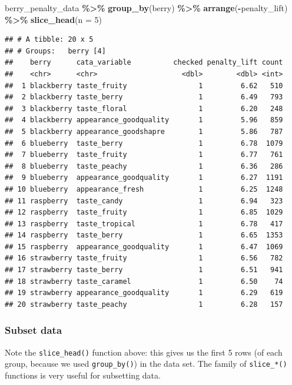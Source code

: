 \documentclass[
]{book}
\newenvironment{Shaded}{\begin{snugshade}}{\end{snugshade}}
\newcommand{\AttributeTok}[1]{\textcolor[rgb]{0.13,0.29,0.53}{#1}}
\newcommand{\DecValTok}[1]{\textcolor[rgb]{0.00,0.00,0.81}{#1}}
\newcommand{\FunctionTok}[1]{\textcolor[rgb]{0.13,0.29,0.53}{\textbf{#1}}}
\newcommand{\NormalTok}[1]{#1}
\newcommand{\SpecialCharTok}[1]{\textcolor[rgb]{0.81,0.36,0.00}{\textbf{#1}}}
\begin{document}
\begin{Shaded}
\begin{Highlighting}[]
\NormalTok{berry\_penalty\_data }\SpecialCharTok{\%\textgreater{}\%}
  \FunctionTok{group\_by}\NormalTok{(berry) }\SpecialCharTok{\%\textgreater{}\%}
  \FunctionTok{arrange}\NormalTok{(}\SpecialCharTok{{-}}\NormalTok{penalty\_lift) }\SpecialCharTok{\%\textgreater{}\%}
  \FunctionTok{slice\_head}\NormalTok{(}\AttributeTok{n =} \DecValTok{5}\NormalTok{)}
\end{Highlighting}
\end{Shaded}

\begin{verbatim}
## # A tibble: 20 x 5
## # Groups:   berry [4]
##    berry      cata_variable          checked penalty_lift count
##    <chr>      <chr>                    <dbl>        <dbl> <int>
##  1 blackberry taste_fruity                 1         6.62   510
##  2 blackberry taste_berry                  1         6.49   793
##  3 blackberry taste_floral                 1         6.20   248
##  4 blackberry appearance_goodquality       1         5.96   859
##  5 blackberry appearance_goodshapre        1         5.86   787
##  6 blueberry  taste_berry                  1         6.78  1079
##  7 blueberry  taste_fruity                 1         6.77   761
##  8 blueberry  taste_peachy                 1         6.36   286
##  9 blueberry  appearance_goodquality       1         6.27  1191
## 10 blueberry  appearance_fresh             1         6.25  1248
## 11 raspberry  taste_candy                  1         6.94   323
## 12 raspberry  taste_fruity                 1         6.85  1029
## 13 raspberry  taste_tropical               1         6.78   417
## 14 raspberry  taste_berry                  1         6.65  1353
## 15 raspberry  appearance_goodquality       1         6.47  1069
## 16 strawberry taste_fruity                 1         6.56   782
## 17 strawberry taste_berry                  1         6.51   941
## 18 strawberry taste_caramel                1         6.50    74
## 19 strawberry appearance_goodquality       1         6.29   619
## 20 strawberry taste_peachy                 1         6.28   157
\end{verbatim}

\hypertarget{subset-data}{%
\subsubsection{Subset data}\label{subset-data}}

Note the \texttt{slice\_head()} function above: this gives us the first 5 rows (of each group, because we used \texttt{group\_by()}) in the data set. The family of \texttt{slice\_*()} functions is very useful for subsetting data.
\end{document}
